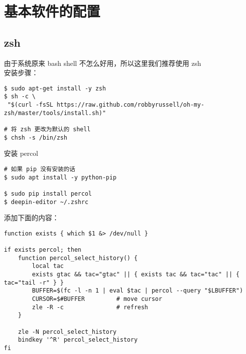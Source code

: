 \section{基本软件的配置}
\subsection{zsh}
由于系统原来 bash shell 不怎么好用，所以这里我们推荐使用 zsh \\

安装步骤：
\begin{lstlisting}
$ sudo apt-get install -y zsh
$ sh -c \
 "$(curl -fsSL https://raw.github.com/robbyrussell/oh-my-zsh/master/tools/install.sh)"

# 将 zsh 更改为默认的 shell 
$ chsh -s /bin/zsh 
\end{lstlisting}

安装 percol
\begin{lstlisting}
# 如果 pip 没有安装的话
$ sudo apt install -y python-pip
 
$ sudo pip install percol
$ deepin-editor ~/.zshrc 
\end{lstlisting}

添加下面的内容：
\begin{lstlisting}
function exists { which $1 &> /dev/null }

if exists percol; then
    function percol_select_history() {
        local tac
        exists gtac && tac="gtac" || { exists tac && tac="tac" || { tac="tail -r" } }
        BUFFER=$(fc -l -n 1 | eval $tac | percol --query "$LBUFFER")
        CURSOR=$#BUFFER         # move cursor
        zle -R -c               # refresh
    }

    zle -N percol_select_history
    bindkey '^R' percol_select_history
fi
\end{lstlisting}
\newpage

